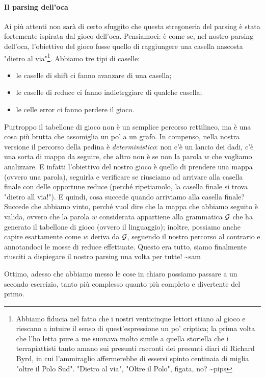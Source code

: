 \documentclass[class=book, crop=false, oneside, 12pt]{standalone}
\begin{document}
\paragraph{Il parsing dell'oca}
Ai più attenti non sarà di certo sfuggito che questa stregoneria del parsing è stata fortemente ispirata dal gioco dell'oca. Pensiamoci: è come se, nel nostro parsing dell'oca, l'obiettivo del gioco fosse quello di raggiungere una casella nascosta "dietro al via"\footnote{Abbiamo fiducia nel fatto che i nostri venticinque lettori stiano al gioco e riescano a intuire il senso di quest'espressione un po' criptica; la prima volta che l'ho letta pure a me suonava molto simile a quella storiella che i terrapiattisti tanto amano sui presunti racconti dei presunti diari di Richard Byrd, in cui l'ammiraglio affermerebbe di essersi spinto centinaia di miglia "oltre il Polo Sud". "Dietro al via", "Oltre il Polo", figata, no? \textasciitilde pips}. Abbiamo tre tipi di caselle:
\begin{itemize}
    \item le caselle di shift ci fanno avanzare di una casella;
    \item le caselle di reduce ci fanno indietrggiare di qualche casella;
    \item le celle error ci fanno perdere il gioco.
\end{itemize}
Purtroppo il tabellone di gioco non è un semplice percorso rettilineo, ma è una cosa più brutta che assomiglia un po' a un grafo. In compenso, nella nostra versione il percorso della pedina è \emph{deterministico}: non c'è un lancio dei dadi, c'è una sorta di mappa da seguire, che altro non è se non la parola \(w\) che vogliamo analizzare. E infatti l'obiettivo del nostro gioco è quello di prendere una mappa (ovvero una parola), seguirla e verificare se riusciamo ad arrivare alla casella finale con delle opportune reduce (perché ripetiamolo, la casella finale si trova "dietro all via!"). E quindi, cosa succede quando arriviamo alla casella finale? Succede che abbiamo vinto, perché vuol dire che la mappa che abbiamo seguito è valida, ovvero che la parola \(w\) considerata appartiene alla grammatica \(\mathcal{G}\) che ha generato il tabellone di gioco (ovvero il linguaggio); inoltre, possiamo anche capire esattamente come \(w\) deriva da \(\mathcal{G}\), seguendo il nostro percorso al contrario e annotandoci le mosse di reduce effettuate. Questo era tutto, siamo finalmente riusciti a dispiegare il nostro parsing una volta per tutte! \textasciitilde sam

Ottimo, adesso che abbiamo messo le cose in chiaro possiamo passare a un secondo esercizio, tanto più complesso quanto più completo e divertente del primo.
\end{document}
